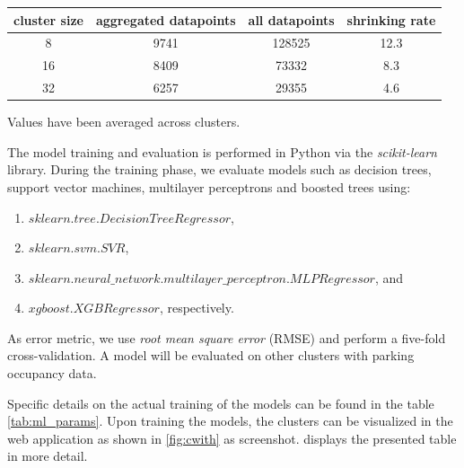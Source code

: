 	\begin{table}[!ht]
		{\begin{tabular}{ | c | c | c | c | } %
				\hline
				{cluster size} & {aggregated datapoints} & {all datapoints} & {shrinking rate} \\ \hline
				8 &	9741 & 128525 &	12.3 \\ \hline
				16 & 8409 &	73332 &	8.3 \\ \hline
				32 & 6257 &	29355 &	4.6 \\ \hline
		\end{tabular}}
		\begin{tabnote}
			Values have been averaged across clusters.
		\end{tabnote}
		\label{tab:models_training_points}
	\end{table}
	
	The model training and evaluation is performed in Python via the \textit{scikit-learn} library. During the training phase, we evaluate models such as decision trees, support vector machines, multilayer perceptrons and boosted trees using:
	\begin{enumerate}
		\item $sklearn.tree.DecisionTreeRegressor$,
		\item $sklearn.svm.SVR$,
		\item $sklearn.neural\_network.multilayer\_perceptron.MLPRegressor$, and
		\item $xgboost.XGBRegressor$, respectively.
	\end{enumerate}
	As error metric, we use \textit{root mean square error} (RMSE) and perform a five-fold cross-validation. A model will be evaluated on other clusters with parking occupancy data.
	
	Specific details on the actual training of the models can be found in the table \cref{tab:ml_params}. Upon training the models, the clusters can be visualized in the web application as shown in \cref{fig:cwith} as screenshot.  displays the presented table in more detail.
	
